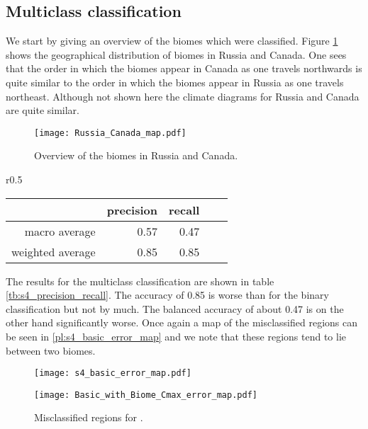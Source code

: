\subsection{Multiclass classification}

We start by giving an overview of the biomes which were classified. Figure \ref{pl:Russia_Canada_map}
shows the geographical distribution of biomes in Russia and Canada. One sees that the order in which the
biomes appear in Canada as one travels northwards is quite similar to the order in which the biomes appear in
Russia as one travels northeast. Although not shown here the climate diagrams for Russia and Canada are quite similar.
\begin{figure}[h]
  \centering
  \texttt{[image: Russia\_Canada\_map.pdf]}
  \caption{Overview of the biomes  in Russia and Canada.}
  \label{pl:Russia_Canada_map}
\end{figure}

\begin{wraptable}{r}{0.5\textwidth}
  \vspace*{-0.3cm}
  \centering
  \begin{tabular}{rrrrr}
    \toprule
     & precision & recall \\
    \midrule
    macro average & 0.57 & 0.47 \\
    weighted average & 0.85 & 0.85 \\
    \bottomrule
  \end{tabular}
  \caption{Average precision and recall for the multiclass classification.}
  \label{tb:s4_precision_recall}
  \vspace*{-1cm}
\end{wraptable}
The results for the multiclass classification are shown in table \ref{tb:s4_precision_recall}.
The accuracy of 0.85 is worse than for the binary classification but not by much.
The balanced accuracy of about 0.47 is on the other hand significantly worse.
Once again a map of the misclassified regions can be seen in \ref{pl:s4_basic_error_map} and
we note that these regions tend to lie between two biomes.
\begin{figure}[h]
  \centering
  \begin{minipage}{0.47\textwidth}
    \centering
    \texttt{[image: s4\_basic\_error\_map.pdf]}
    \caption{Misclassified regions for .}
    \label{pl:s4_basic_error_map}
  \end{minipage}
  \hfill
  \begin{minipage}{0.47\textwidth}
    \centering
    \texttt{[image: Basic\_with\_Biome\_Cmax\_error\_map.pdf]}
    \caption{Misclassified regions for .}
    \label{pl:Basic_with_Biome_Cmax_error_map}
  \end{minipage}
\end{figure}

